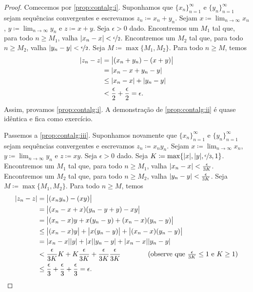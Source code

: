 \begin{proof}
Comecemos por \ref{prop:contalg:i}.
Suponhamos que $\{ x_n \}_{n=1}^\infty$ e $\{ y_n \}_{n=1}^\infty$ sejam sequências convergentes e
escrevamos $z_n \coloneqq x_n + y_n$. Sejam $x \coloneqq \lim_{n\to\infty} x_n$,
$y \coloneqq \lim_{n\to\infty} y_n$ e $z \coloneqq x+y$.
Seja $\epsilon > 0$ dado.
Encontremos um $M_1$ tal que, para todo $n \geq M_1$,
valha
$\lvert {x_n - x} \rvert < \nicefrac{\epsilon}{2}$.
Encontremos um $M_2$ tal que, para todo $n \geq M_2$,
valha
$\lvert {y_n - y} \rvert < \nicefrac{\epsilon}{2}$. Seja $M \coloneqq \max \{ M_1, M_2 \}$.
Para todo $n \geq M$, temos
\begin{equation*}
\begin{split}
\lvert {z_n - z} \rvert &=
\bigl\lvert {(x_n+y_n) - (x+y)} \bigr\rvert \\
& =
\lvert {x_n-x + y_n-y} \rvert \\
& \leq
\lvert {x_n-x} \rvert + \lvert {y_n-y} \rvert \\
& <
\frac{\epsilon}{2} +
\frac{\epsilon}{2}
= \epsilon.
\end{split}
\end{equation*}
Assim, provamos \ref{prop:contalg:i}.
A demonstração de \ref{prop:contalg:ii} é quase idêntica e fica como
exercício.

Passemos a
\ref{prop:contalg:iii}.
Suponhamos novamente que $\{ x_n \}_{n=1}^\infty$ e $\{ y_n \}_{n=1}^\infty$ sejam sequências convergentes e
escrevamos $z_n \coloneqq x_n y_n$. Sejam $x \coloneqq \lim_{n\to\infty} x_n$,
$y \coloneqq \lim_{n\to\infty} y_n$ e $z \coloneqq xy$.
Seja $\epsilon > 0$ dado.
Seja $K \coloneqq \max\{ \lvert {x} \rvert, \lvert {y} \rvert, \nicefrac{\epsilon}{3} , 1 \}$.
Encontremos um $M_1$ tal que, para todo $n \geq M_1$,
valha
$\lvert {x_n - x} \rvert < \frac{\epsilon}{3K}$.
Encontremos um $M_2$ tal que, para todo $n \geq M_2$,
valha
$\lvert {y_n - y} \rvert < \frac{\epsilon}{3K}$. Seja $M \coloneqq \max \{ M_1, M_2 \}$.
Para todo $n \geq M$, temos
\begin{equation*}
\begin{split}
\lvert {z_n - z} \rvert &=
\bigl\lvert {(x_ny_n) - (xy)} \bigr\rvert \\
& =
\bigl\lvert {(x_n-x+x)(y_n-y+y) - xy} \bigr\rvert \\
& =
\bigl\lvert {(x_n-x)y + x(y_n-y) +(x_n-x)(y_n-y)} \bigr\rvert \\
& \leq
\bigl\lvert {(x_n-x)y} \bigr\rvert + \bigl\lvert {x(y_n - y)} \bigr\rvert +
\bigl\lvert {(x_n-x)(y_n-y)} \bigr\rvert \\
& =
\lvert {x_n -x} \rvert\lvert {y} \rvert +
\lvert {x} \rvert\lvert {y_n -y} \rvert +
\lvert {x_n -x} \rvert\lvert {y_n -y} \rvert
\\
& <
\frac{\epsilon}{3K} K +
K \frac{\epsilon}{3K} +
\frac{\epsilon}{3K}
\frac{\epsilon}{3K}
\qquad \qquad \text{(observe que } \tfrac{\epsilon}{3K} \leq 1
\text{ e }
K \geq 1\text{)}
\\
& \leq
\frac{\epsilon}{3} + \frac{\epsilon}{3} + \frac{\epsilon}{3}
= \epsilon .
\end{split}
\end{equation*}


\end{proof}
